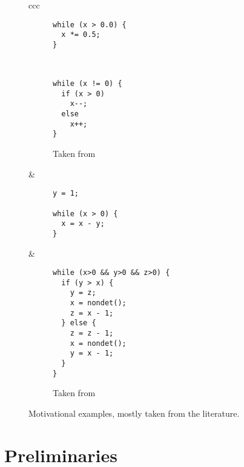 \documentclass[preprint]{sigplanconf}
\theoremstyle{definition}
\begin{document}
\begin{figure*}
\begin{tabular}{ccc}
\begin{subfigure}[b]{0.3\textwidth}
\begin{lstlisting}
while (x > 0.0) {
  x *= 0.5;
}
\end{lstlisting}
\caption{}
 \label{fig:motivation.f}
\end{subfigure} \\
\hline

\begin{subfigure}[b]{0.3\textwidth}
\begin{lstlisting}
while (x != 0) {
  if (x > 0)
    x--;
  else
    x++;
}
\end{lstlisting}
\caption{Taken from \cite{DBLP:conf/tacas/CookSZ13}}
 \label{fig:motivation.g}
\end{subfigure} 


&

\begin{subfigure}[b]{0.3\textwidth}
\begin{lstlisting}
y = 1;

while (x > 0) {
  x = x - y;
}
\end{lstlisting}
\caption{}
 \label{fig:motivation.h}
\end{subfigure} 


&


\begin{subfigure}[b]{0.3\textwidth}
\begin{lstlisting}
while (x>0 && y>0 && z>0) {
  if (y > x) {
    y = z;
    x = nondet();
    z = x - 1;
  } else {
    z = z - 1;
    x = nondet();
    y = x - 1;
  }
}
\end{lstlisting}
\caption{Taken from~\cite{BA:mcs}}
 \label{fig:motivation.i}
\end{subfigure} 
% 
% 
% 
% 

\end{tabular}
\caption{Motivational examples, mostly taken from the literature.\label{fig:motivation}}
\end{figure*}




\section{Preliminaries}
\end{document}
